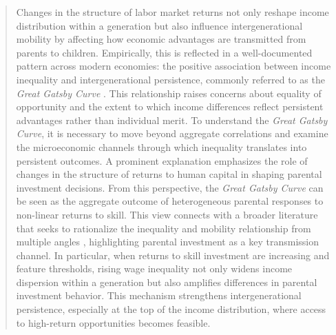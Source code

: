 \documentclass[12pt]{article}
\begin{document}
\begin{abstract}
Changes in the structure of labor market returns not only reshape income distribution within a generation but also influence intergenerational mobility by affecting how economic advantages are transmitted from parents to children. Empirically, this is reflected in a well-documented pattern across modern economies: the positive association between income inequality and intergenerational persistence, commonly referred to as the \emph{Great Gatsby Curve} \parencite{Krueger_2012,Corak_2013}. This relationship raises concerns about equality of opportunity and the extent to which income differences reflect persistent advantages rather than individual merit. To understand the \emph{Great Gatsby Curve}, it is necessary to move beyond aggregate correlations and examine the microeconomic channels through which inequality translates into persistent outcomes. A prominent explanation emphasizes the role of changes in the structure of returns to human capital in shaping parental investment decisions. From this perspective, the \emph{Great Gatsby Curve} can be seen as the aggregate outcome of heterogeneous parental responses to non-linear returns to skill. This view connects with a broader literature that seeks to rationalize the inequality and mobility relationship from multiple angles \parencite{Becker_2018,Durlauf_2018,BouchardSt-Amant2024}, highlighting parental investment as a key transmission channel. In particular, when returns to skill investment are increasing and feature thresholds, rising wage inequality not only widens income dispersion within a generation but also amplifies differences in parental investment behavior. This mechanism strengthens intergenerational persistence, especially at the top of the income distribution, where access to high-return opportunities becomes feasible.



\end{abstract}
\end{document}
